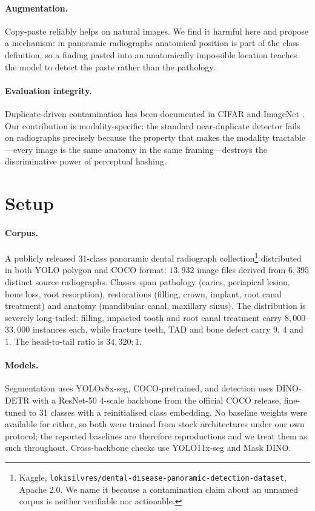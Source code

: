 \documentclass[10pt,twocolumn,letterpaper]{article}
\begin{document}
\paragraph{Augmentation.} Copy-paste \cite{ghiasi2021copypaste} reliably helps on
natural images. We find it harmful here and propose a mechanism: in panoramic
radiographs anatomical position is part of the class definition, so a finding
pasted into an anatomically impossible location teaches the model to detect the
paste rather than the pathology.

\paragraph{Evaluation integrity.} Duplicate-driven contamination has been
documented in CIFAR and ImageNet \cite{barz2020cifar,recht2019imagenet}. Our contribution is modality-specific: the standard near-duplicate
detector fails on radiographs precisely because the property that makes the
modality tractable---every image is the same anatomy in the same
framing---destroys the discriminative power of perceptual hashing.

\section{Setup}

\paragraph{Corpus.} A publicly released 31-class panoramic dental radiograph
collection\footnote{Kaggle, \texttt{lokisilvres/dental-disease-panoramic-detection-dataset},
Apache 2.0. We name it because a contamination claim about an unnamed corpus is
neither verifiable nor actionable.} distributed in both YOLO polygon and COCO
format: $13{,}932$ image files derived from $6{,}395$ distinct source
radiographs. Classes span pathology (caries, periapical lesion, bone loss, root
resorption), restorations (filling, crown, implant, root canal treatment) and
anatomy (mandibular canal, maxillary sinus). The distribution is severely
long-tailed: filling, impacted tooth and root canal treatment carry
$8{,}000$--$33{,}000$ instances each, while fracture teeth, TAD and bone defect
carry $9$, $4$ and $1$. The head-to-tail ratio is $34{,}320{:}1$.

\paragraph{Models.} Segmentation uses YOLOv8x-seg, COCO-pretrained, and
detection uses DINO-DETR\cite{zhang2023dino} with a ResNet-50 4-scale backbone
from the official COCO release, fine-tuned to 31 classes with a reinitialised
class embedding. No baseline weights were available for either, so both were
trained from stock architectures under our own protocol; the reported baselines
are therefore reproductions and we treat them as such throughout. Cross-backbone
checks use YOLO11x-seg and Mask DINO.
\end{document}
